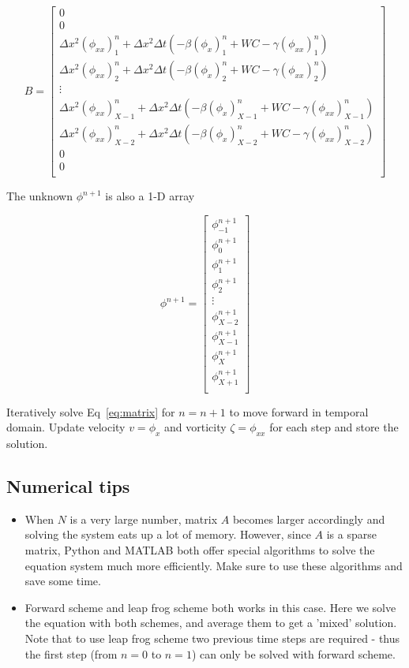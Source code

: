\documentclass[12pt]{article}
\begin{document}
\begin{equation}
B=\begin{bmatrix}
	0 \\
	0 \\
	\Delta x^2(\phi_{xx})_1^n + \Delta x^2\Delta t(-\beta(\phi_x)_1^n + WC - \gamma(\phi_{xx})_1^n)\\
	\Delta x^2(\phi_{xx})_2^n + \Delta x^2\Delta t(-\beta(\phi_x)_2^n + WC - \gamma(\phi_{xx})_2^n)\\
	\vdots \\
	\Delta x^2(\phi_{xx})_{X-1}^n + \Delta x^2\Delta t(-\beta(\phi_x)_{X-1}^n + WC - \gamma(\phi_{xx})_{X-1}^n)\\
	\Delta x^2(\phi_{xx})_{X-2}^n + \Delta x^2\Delta t(-\beta(\phi_x)_{X-2}^n + WC - \gamma(\phi_{xx})_{X-2}^n)\\
	0 \\
	0 \\
	\end{bmatrix}
\end{equation}

The unknown $\phi^{n+1}$ is also a 1-D array

\begin{equation}
\phi^{n+1}=\begin{bmatrix}
	\phi_{-1}^{n+1} \\
	\phi_{0}^{n+1} \\
	\phi_{1}^{n+1} \\
	\phi_{2}^{n+1} \\
	\vdots \\
	\phi_{X-2}^{n+1} \\
	\phi_{X-1}^{n+1} \\
	\phi_{X}^{n+1} \\
	\phi_{X+1}^{n+1} \\
	\end{bmatrix}
\end{equation}

Iteratively solve Eq~\ref{eq:matrix} for $n=n+1$ to move forward in temporal domain. Update velocity $v=\phi_x$ and vorticity $\zeta=\phi_{xx}$ for each step and store the solution.\\

\subsection{Numerical tips}
\begin{itemize}
\item When $N$ is a very large number, matrix $A$ becomes larger accordingly and solving the system eats up a lot of memory. However, since $A$ is a sparse matrix, Python and MATLAB both offer special algorithms to solve the equation system much more efficiently. Make sure to use these algorithms and save some time.
\item Forward scheme and leap frog scheme both works in this case. Here we solve the equation with both schemes, and average them to get a 'mixed' solution. Note that to use leap frog scheme two previous time steps are required - thus the first step (from $n=0$ to $n=1$) can only be solved with forward scheme.
\end{itemize}
\end{document}
